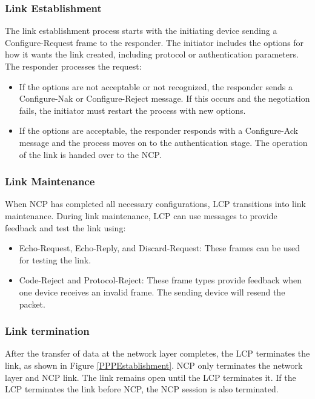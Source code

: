\subsubsection{Link Establishment}

The link establishment process starts with the initiating device sending a Configure-Request frame to the responder. The initiator includes the options for how it wants the link created, including protocol or authentication parameters. The responder processes the request: 

\begin{itemize}
\item If the options are not acceptable or not recognized, the responder sends a Configure-Nak or Configure-Reject message. If this occurs and the negotiation fails, the initiator must restart the process with new options. 


\item If the options are acceptable, the responder responds with a Configure-Ack message and the process moves on to the authentication stage. The operation of the link is handed over to the NCP.
\end{itemize}

\subsubsection{Link Maintenance}

When NCP has completed all necessary configurations, LCP transitions into link maintenance. During link maintenance, LCP can use messages to provide feedback and test the link using:

\begin{itemize}
\item Echo-Request, Echo-Reply, and Discard-Request: These frames can be used for testing the link.


\item Code-Reject and Protocol-Reject: These frame types provide feedback when one device receives an invalid frame. The sending device will resend the packet.
\end{itemize} 

\subsubsection{Link termination}

After the transfer of data at the network layer completes, the LCP terminates the link, as shown in Figure \ref{PPPEstablishment}. NCP only terminates the network layer and NCP link. The link remains open until the LCP terminates it. If the LCP terminates the link before NCP, the NCP session is also terminated. \\

